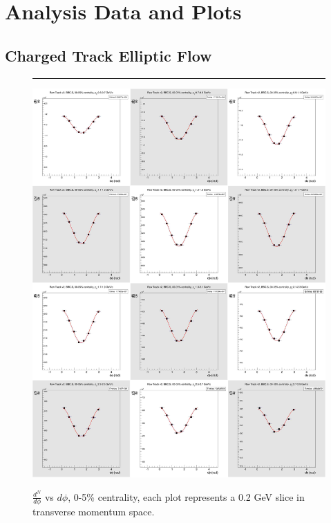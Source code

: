 \chapter{Analysis Data and Plots} %
\label{app:data}

\section{Charged Track Elliptic Flow}
\begin{figure}[H]
  \centering
  \caption[$\frac{dN}{d\phi}$ vs $d\phi$, 0-5\% centrality.]{$\frac{d^N}{d\phi}$ vs $d\phi$, 0-5\% centrality, each plot represents a 0.2 GeV slice in transverse momentum space.}
  \rule{35em}{0.5pt}
    \includegraphics[width=1\textwidth]{chargedtrackv2/htrkdphi2bbcs_0.jpg}
  \label{fig:Ndphicent0}
\end{figure}

